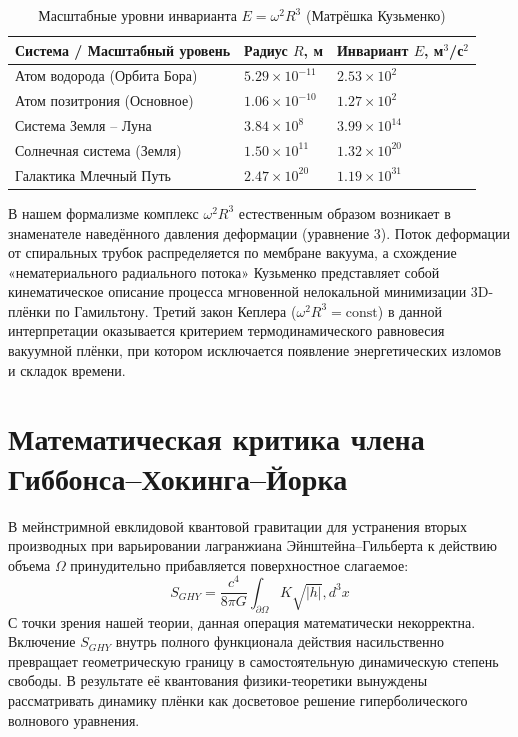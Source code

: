\documentclass[12pt,a4paper]{article}
\newenvironment{ruledtabular}
  {\def\toprule{\hline\hline}\def\colrule{\hline}\def\botrule{\hline\hline}}
  {}
\begin{document}
\begin{table}[h!]  
\caption{\label{tab:matreshka} Масштабные уровни инварианта $E = \omega^2 R^3$ (Матрёшка Кузьменко)}  
\begin{ruledtabular}  
\begin{tabular}{lll}  
Система / Масштабный уровень & Радиус $R$, м & Инвариант $E$, м$^3$/с$^2$ \\
\hline  
Атом водорода (Орбита Бора) & $5.29 \times 10^{-11}$ & $2.53 \times 10^{2}$ \\
Атом позитрония (Основное) & $1.06 \times 10^{-10}$ & $1.27 \times 10^{2}$ \\
Система Земля \--- Луна & $3.84 \times 10^{8}$ & $3.99 \times 10^{14}$ \\
Солнечная система (Земля) & $1.50 \times 10^{11}$ & $1.32 \times 10^{20}$ \\
Галактика Млечный Путь & $2.47 \times 10^{20}$ & $1.19 \times 10^{31}$ \\
\end{tabular}  
\end{ruledtabular}  
\end{table}

В нашем формализме комплекс $\omega^2 R^3$ естественным образом возникает в знаменателе наведённого давления деформации (уравнение 3). Поток деформации от спиральных трубок распределяется по мембране вакуума, а схождение «нематериального радиального потока» Кузьменко \cite{Kuzmenko3} представляет собой кинематическое описание процесса мгновенной нелокальной минимизации 3D-плёнки по Гамильтону. Третий закон Кеплера ($\omega^2 R^3 = \text{const}$) в данной интерпретации оказывается критерием термодинамического равновесия вакуумной плёнки, при котором исключается появление энергетических изломов и складок времени.

\section{Математическая критика члена Гиббонса--Хокинга--Йорка}  
В мейнстримной евклидовой квантовой гравитации \cite{Hawking1976} для устранения вторых производных при варьировании лагранжиана Эйнштейна--Гильберта к действию объема $\Omega$ принудительно прибавляется поверхностное слагаемое:  
\begin{equation}  
S_{GHY} = \frac{c^4}{8\pi G} \int_{\partial\Omega} K \sqrt{|h|} , d^3x  
\end{equation}  
С точки зрения нашей теории, данная операция математически некорректна. Включение $S_{GHY}$ внутрь полного функционала действия насильственно превращает геометрическую границу в самостоятельную динамическую степень свободы. В результате её квантования физики-теоретики вынуждены рассматривать динамику плёнки как досветовое решение гиперболического волнового уравнения.
\end{document}
